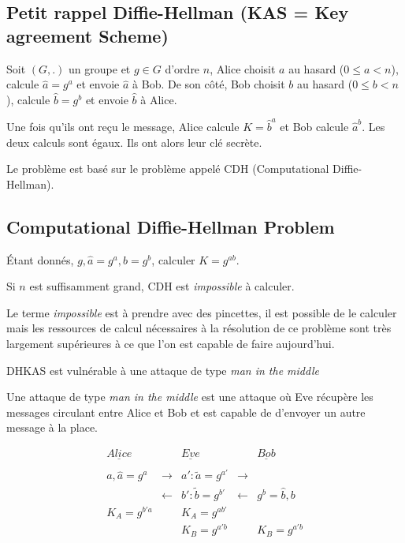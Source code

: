 \documentclass[a4paper, 10pt]{thesis}
\begin{document}

\subsection{Petit rappel Diffie-Hellman (KAS = Key agreement Scheme)}

Soit $(G, .)$ un groupe et $g \in G$ d'ordre $n$, Alice choisit $a$ au hasard ($0\leq a < n$),
calcule $\hat{a} = g^a$ et envoie $\hat{a}$ à Bob. De son côté, Bob choisit $b$ au hasard ($0 \leq b
< n$), calcule $\hat{b} = g^b$ et envoie $\hat{b}$ à Alice.

Une fois qu'ils ont reçu le message, Alice calcule $K = \hat{b}^a$ et Bob calcule $\hat{a}^b$. Les
deux calculs sont égaux. Ils ont alors leur clé secrète.

Le problème est basé sur le problème appelé CDH (Computational Diffie-Hellman).

\subsection{Computational Diffie-Hellman Problem}

Étant donnés, $g, \hat{a} = g^a, \hat{b} = g^b$, calculer $K = g^{ab}$.

\begin{conj}
    Si $n$ est suffisamment grand, CDH est \emph{impossible} à calculer.
\end{conj}

\begin{rmq}
    Le terme \emph{impossible} est à prendre avec des pincettes, il est possible de le calculer mais
    les ressources de calcul nécessaires à la résolution de ce problème sont très largement
    supérieures à ce que l'on est capable de faire aujourd'hui.
\end{rmq}

\begin{rmq}
    DHKAS est vulnérable à une attaque de type \emph{man in the middle}
\end{rmq}

\begin{df}
    Une attaque de type \emph{man in the middle} est une attaque où Eve récupère les messages
    circulant entre Alice et Bob et est capable de d'envoyer un autre message à la place.
\end{df}

\begin{displaymath}
    \begin{array}{ccccc}
        \underline{Alice} & & \underline{Eve} & & \underline{Bob} \\
        \\
        a, \hat{a} = g^a & \longrightarrow & a' : \tilde{a} = g^{a'} & \longrightarrow & \\
                         & \longleftarrow & b' : \tilde{b} = g^{b'} & \longleftarrow & g^b = \hat{b}, b \\
        K_A = g^{b'a} & & K_A = g^{ab'} & & \\
                      & & K_B = g^{a'b} & & K_B = g^{a'b} \\
    \end{array}
\end{displaymath}
\end{document}
